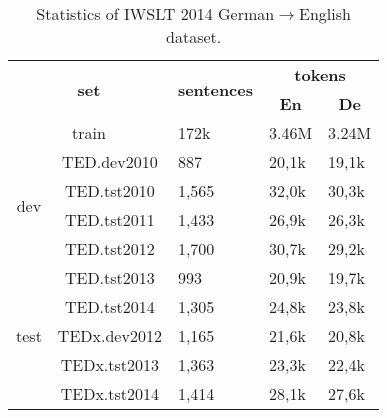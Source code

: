 \begin{table}[h]
    \centering
    \begin{tabular}{@{}cclll@{}}
        \toprule
        \multicolumn{2}{c}{\multirow{2}{*}{\textbf{set}}} & \multicolumn{1}{c}{\multirow{2}{*}{\textbf{sentences}}} & \multicolumn{2}{c}{\textbf{tokens}}                                           \\ %
        \multicolumn{2}{c}{}                              & \multicolumn{1}{c}{}                                    & \multicolumn{1}{c}{\textbf{En}}     & \multicolumn{1}{c}{\textbf{De}}         \\ \toprule
        \multicolumn{2}{c}{train}                         & 172k                                                    & 3.46M                               & 3.24M                                   \\ \midrule
        \multirow{4}{*}{dev}                              & TED.dev2010                                             & 887                                 & 20,1k                           & 19,1k \\
                                                          & TED.tst2010                                             & 1,565                               & 32,0k                           & 30,3k \\
                                                          & TED.tst2011                                             & 1,433                               & 26,9k                           & 26,3k \\
                                                          & TED.tst2012                                             & 1,700                               & 30,7k                           & 29,2k \\ \midrule
        \multirow{5}{*}{test}                             & TED.tst2013                                             & 993                                 & 20,9k                           & 19,7k \\
                                                          & TED.tst2014                                             & 1,305                               & 24,8k                           & 23,8k \\
                                                          & TEDx.dev2012                                            & 1,165                               & 21,6k                           & 20,8k \\
                                                          & TEDx.tst2013                                            & 1,363                               & 23,3k                           & 22,4k \\
                                                          & TEDx.tst2014                                            & 1,414                               & 28,1k                           & 27,6k \\ \bottomrule
    \end{tabular}
    \caption{Statistics of IWSLT 2014 German$\rightarrow$English dataset.}
    \label{tab:iwslt14stat}
\end{table}

